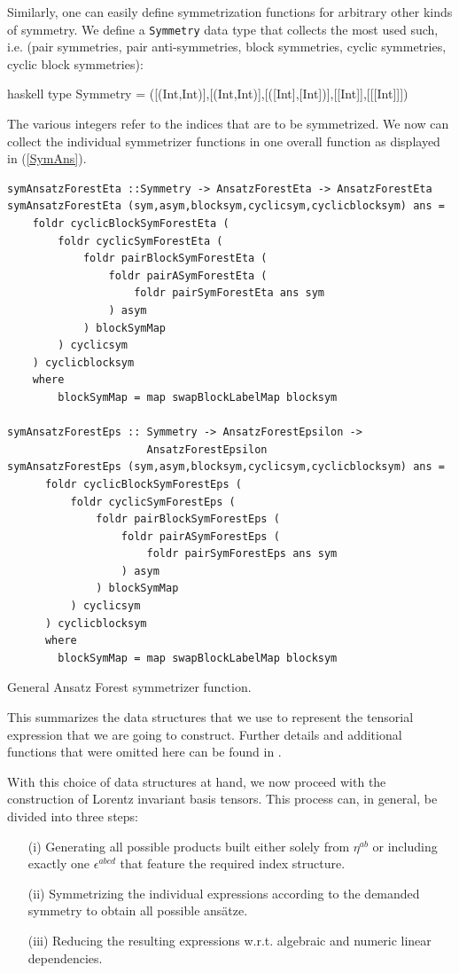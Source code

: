 \documentclass[a4paper,12pt, DIV=14, BCOR=5mm, twoside, headsepline, numbers=noenddot]{scrbook}
\begin{document}
Similarly, one can easily define symmetrization functions for arbitrary other kinds of symmetry. We define a \texttt{Symmetry} data type that collects the most used such, i.e. (pair symmetries, pair anti-symmetries, block symmetries, cyclic symmetries, cyclic block symmetries):
\begin{center}
\begin{cminted}{haskell}
type Symmetry = ([(Int,Int)],[(Int,Int)],[([Int],[Int])],[[Int]],[[[Int]]])
\end{cminted}
\end{center}
The various integers refer to the indices that are to be symmetrized. We now can collect the individual symmetrizer functions in one overall function as displayed in (\ref{SymAns}).
\begin{listing}[hbt!] 
\begin{verbatim}
symAnsatzForestEta ::Symmetry -> AnsatzForestEta -> AnsatzForestEta
symAnsatzForestEta (sym,asym,blocksym,cyclicsym,cyclicblocksym) ans =
    foldr cyclicBlockSymForestEta (
        foldr cyclicSymForestEta (
            foldr pairBlockSymForestEta (
                foldr pairASymForestEta (
                    foldr pairSymForestEta ans sym
                ) asym
            ) blockSymMap
        ) cyclicsym
    ) cyclicblocksym
    where
        blockSymMap = map swapBlockLabelMap blocksym

symAnsatzForestEps :: Symmetry -> AnsatzForestEpsilon ->
                      AnsatzForestEpsilon
symAnsatzForestEps (sym,asym,blocksym,cyclicsym,cyclicblocksym) ans =
      foldr cyclicBlockSymForestEps (
          foldr cyclicSymForestEps (
              foldr pairBlockSymForestEps (
                  foldr pairASymForestEps (
                      foldr pairSymForestEps ans sym
                  ) asym
              ) blockSymMap
          ) cyclicsym
      ) cyclicblocksym
      where
        blockSymMap = map swapBlockLabelMap blocksym
\end{verbatim} 
\caption{General Ansatz Forest symmetrizer function.}\label{SymAns}
\end{listing}

This summarizes the data structures that we use to represent the tensorial expression that we are going to construct. Further details and additional functions that were omitted here can be found in \cite{sparse-tensor}.  

With this choice of data structures at hand, we now proceed with the construction of Lorentz invariant basis tensors.  
This process can, in general, be divided into three steps:
\begin{itemize}
    \item[(i)] Generating all possible products built either solely from $\eta^{ab}$ or including exactly one $\epsilon^{abcd}$ that feature the required index structure.
    \item[(ii)] Symmetrizing the individual expressions according to the demanded symmetry to obtain all possible ansätze.
    \item[(iii)] Reducing the resulting expressions w.r.t. algebraic and numeric linear dependencies.
\end{itemize}
\end{document}
